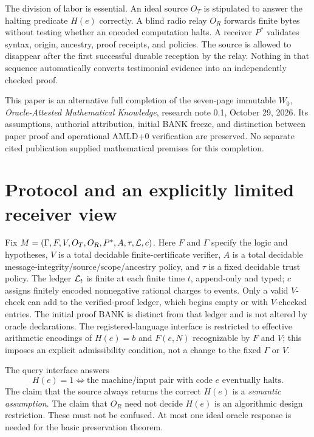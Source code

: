 \documentclass[11pt,letterpaper]{article}
\begin{document}
The division of labor is essential. An ideal source $O_T$ is stipulated to answer the halting predicate $H(e)$ correctly. A blind radio relay $O_R$ forwards finite bytes without testing whether an encoded computation halts. A receiver $P^*$ validates syntax, origin, ancestry, proof receipts, and policies. The source is allowed to disappear after the first successful durable reception by the relay. Nothing in that sequence automatically converts testimonial evidence into an independently checked proof.

This paper is an alternative full completion of the seven-page immutable $W_0$, \emph{Oracle-Attested Mathematical Knowledge}, research note 0.1, October 29, 2026. Its assumptions, authorial attribution, initial BANK freeze, and distinction between paper proof and operational AMLD+0 verification are preserved. No separate cited publication supplied mathematical premises for this completion.

\section{Protocol and an explicitly limited receiver view}
\begin{definition}
Fix $M=(\Gamma,F,V,O_T,O_R,P^*,A,\tau,\mathcal L,c)$. Here $F$ and $\Gamma$ specify the logic and hypotheses, $V$ is a total decidable finite-certificate verifier, $A$ is a total decidable message-integrity/source/scope/ancestry policy, and $\tau$ is a fixed decidable trust policy. The ledger $\mathcal L_t$ is finite at each finite time $t$, append-only and typed; $c$ assigns finitely encoded nonnegative rational charges to events. Only a valid $V$-check can add to the verified-proof ledger, which begins empty or with $V$-checked entries. The initial proof BANK is distinct from that ledger and is not altered by oracle declarations. The registered-language interface is restricted to effective arithmetic encodings of $H(e)=b$ and $F(e,N)$ recognizable by $F$ and $V$; this imposes an explicit admissibility condition, not a change to the fixed $\Gamma$ or $V$.
\end{definition}
The query interface answers
\[
H(e)=1\iff\text{the machine/input pair with code $e$ eventually halts}.
\]
The claim that the source always returns the correct $H(e)$ is a \emph{semantic assumption}. The claim that $O_R$ need not decide $H(e)$ is an algorithmic design restriction. These must not be confused. At most one ideal oracle response is needed for the basic preservation theorem.
\end{document}

